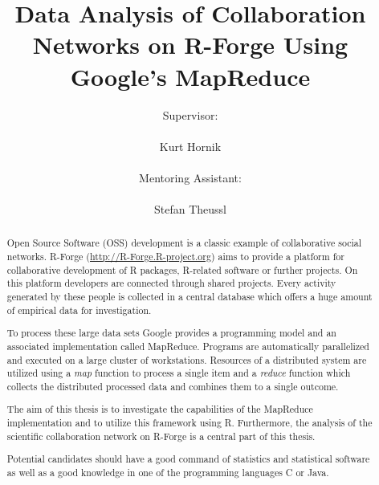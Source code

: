 \documentclass[a4paper]{article}
\author{Supervisor:\\\\Kurt Hornik\\\\Mentoring Assistant:\\\\ 
        Stefan Theussl}
\title{Data Analysis of Collaboration Networks on R-Forge Using Google's MapReduce}
\newcommand{\proglang}[1]{\textsf{#1}}
\begin{document}
\maketitle

\begin{abstract} Open Source Software (OSS) development is a classic example
  of collaborative social networks. R-Forge
  (\url{http://R-Forge.R-project.org}) aims to provide a platform for
  collaborative development of \proglang{R} packages,
  \proglang{R}-related software or further projects. On this platform
  developers are connected through shared projects. Every activity
  generated by these people is collected in a central database which
  offers a huge amount of empirical data for investigation. 

  To process these large data sets Google provides a programming
  model and an associated implementation called MapReduce. Programs
  are automatically parallelized and executed on a large cluster of
  workstations. Resources of a distributed system are utilized using a
  \textit{map} function to process a single item and a \textit{reduce}
  function which 
  collects the distributed processed data and combines them to a
  single outcome. 

  The aim of this thesis is to investigate the capabilities of the
  MapReduce implementation and to utilize this framework using
  \proglang{R}. Furthermore, the analysis of the scientific
  collaboration network on R-Forge is a central part of this
  thesis. 

  Potential candidates should have a good command of statistics and
  statistical software as well as a good knowledge in one of the
  programming languages \proglang{C} or \proglang{Java}.
\end{abstract}



%
%
%
\end{document}
